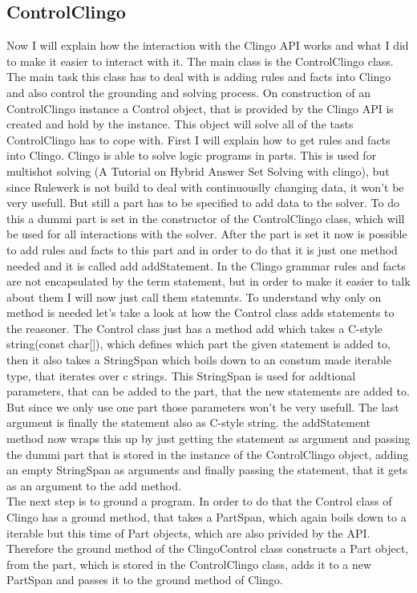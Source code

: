 \documentclass[hyperref, bachelorofscience]{cgvpub}
\begin{document}
\subsection{ControlClingo}
Now I will explain how the interaction with the Clingo API works and what I did to make it easier to interact with it. The main class is the ControlClingo class. The main task this class has to deal with is adding rules and facts into Clingo and also control the grounding and solving process. On construction of an ControlClingo instance a Control object, that is provided by the Clingo API is created and hold by the instance. This object will solve all of the tasts ControlClingo has to cope with. First I will explain how to get rules and facts into Clingo. Clingo is able to solve logic programs in parts. This is used for multishot solving (A Tutorial on Hybrid Answer Set Solving with clingo), but since Rulewerk is not build to deal with continuouslly changing data, it won't be very usefull. But still a part has to be specified to add data to the solver. To do this a dummi part is set in the constructor of the ControlClingo class, which will be used for all interactions with the solver. After the part is set it now is possible to add rules and facts to this part and in order to do that it is just one method needed and it is called add addStatement. In the Clingo grammar rules and facts are not encapsulated by the term statement, but in order to make it easier to talk about them I will now just call them statemnts. To understand why only on method is needed let's take a look at how the Control class adds statements to the reasoner. The Control class just has a method add which takes a C-style string(const char[]), which defines which part the given statement is added to, then it also takes a StringSpan which boils down to an constum made iterable type, that iterates over c strings. This StringSpan is used for addtional parameters, that can be added to the part, that the new statements are added to. But since we only use one part those parameters won't be very usefull. The last argument is finally the statement also as C-style string.
the addStatement method now wraps this up by just getting the statement as argument and passing the dummi part that is stored in the instance of the ControlClingo object, adding an empty StringSpan as arguments and finally passing the statement, that it gets as an argument to the add method. \\
The next step is to ground a program. In order to do that the Control class of Clingo has a ground method, that takes a PartSpan, which again boils down to a iterable but this time of Part objects, which are also privided by the API. Therefore the ground method of the ClingoControl class constructs a Part object, from the part, which is stored in the ControlClingo class, adds it to a new PartSpan and passes it to the ground method of Clingo.\\
\end{document}
